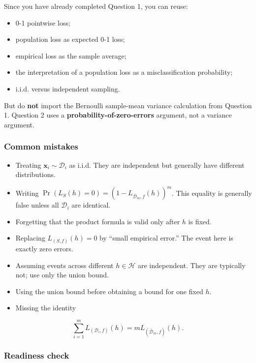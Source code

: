 \documentclass[11pt,a4paper]{article}
\theoremstyle{definition}
\begin{document}
Since you have already completed Question 1, you can reuse:

\begin{itemize}
    \item 0-1 pointwise loss;
    \item population loss as expected 0-1 loss;
    \item empirical loss as the sample average;
    \item the interpretation of a population loss as a misclassification probability;
    \item i.i.d. versus independent sampling.
\end{itemize}

But do \textbf{not} import the Bernoulli sample-mean variance calculation from Question 1. Question 2 uses a \textbf{probability-of-zero-errors} argument, not a variance argument.

\subsubsection{Common mistakes}

\begin{itemize}
    \item Treating $\boldsymbol{x}_i \sim \mathcal{D}_i$ as i.i.d. They are independent but generally have different distributions.
    \item Writing $\Pr(L_S(h) = 0) = (1 - L_{\bar{\mathcal{D}}_m, f}(h))^m$. This equality is generally false unless all $\mathcal{D}_i$ are identical.
    \item Forgetting that the product formula is valid only after $h$ is fixed.
    \item Replacing $L_{(S,f)}(h) = 0$ by ``small empirical error.'' The event here is exactly zero errors.
    \item Assuming events across different $h \in \mathcal{H}$ are independent. They are typically not; use only the union bound.
    \item Using the union bound before obtaining a bound for one fixed $h$.
    \item Missing the identity
\end{itemize}

\[
\sum_{i=1}^m L_{(\mathcal{D}_i, f)}(h) = m L_{(\bar{\mathcal{D}}_m, f)}(h).
\]

\subsubsection{Readiness check}
\end{document}
